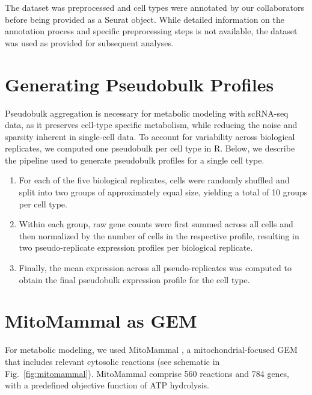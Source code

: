 The dataset was preprocessed and cell types were annotated by our collaborators before being provided as a Seurat object.  While detailed information on the annotation process and specific preprocessing steps is not available, the dataset was used as provided for subsequent analyses. 

\section{Generating Pseudobulk Profiles}
Pseudobulk aggregation is necessary for metabolic modeling with scRNA-seq data, as it preserves cell-type specific metabolism, while reducing the noise and sparsity inherent in single-cell data. To account for variability across biological replicates, we computed one pseudobulk per cell type in R. Below, we describe the pipeline used to generate pseudobulk profiles for a single cell type. 
\\

\begin{enumerate}
    \item For each of the five biological replicates, cells were randomly shuffled and split into two groups of approximately equal size, yielding a total of 10 groups per cell type.
    \item Within each group, raw gene counts were first summed across all cells and then normalized by the number of cells in the respective profile, resulting in two pseudo-replicate expression profiles per biological replicate.
    \item Finally, the mean expression across all pseudo-replicates was computed to obtain the final pseudobulk expression profile for the cell type.
\end{enumerate}

\section{MitoMammal as GEM}
For metabolic modeling, we used MitoMammal \citep{CHAPMANMitoMAMMALGenomeScale2025}, a mitochondrial-focused GEM that includes relevant cytosolic reactions (see schematic in Fig.~\ref{fig:mitomammal}).
MitoMammal comprise 560 reactions and 784 genes, with a predefined objective function of ATP hydrolysis.
\\

